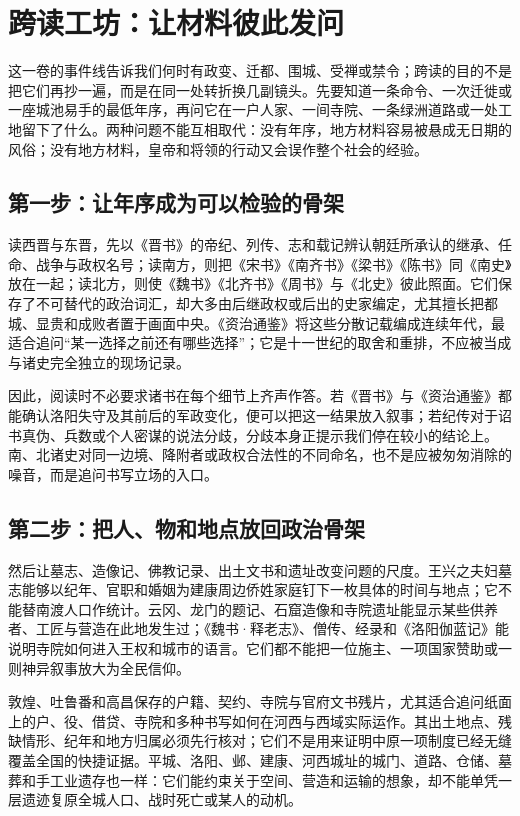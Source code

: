 \section{跨读工坊：让材料彼此发问}
\label{sec:synthesis-cross-reading}

这一卷的事件线告诉我们何时有政变、迁都、围城、受禅或禁令；跨读的目的不是把它们再抄一遍，而是在同一处转折换几副镜头。先要知道一条命令、一次迁徙或一座城池易手的最低年序，再问它在一户人家、一间寺院、一条绿洲道路或一处工地留下了什么。两种问题不能互相取代：没有年序，地方材料容易被悬成无日期的风俗；没有地方材料，皇帝和将领的行动又会误作整个社会的经验。

\subsection{第一步：让年序成为可以检验的骨架}

读西晋与东晋，先以《晋书》的帝纪、列传、志和载记辨认朝廷所承认的继承、任命、战争与政权名号；读南方，则把《宋书》《南齐书》《梁书》《陈书》同《南史》放在一起；读北方，则使《魏书》《北齐书》《周书》与《北史》彼此照面。它们保存了不可替代的政治词汇，却大多由后继政权或后出的史家编定，尤其擅长把都城、显贵和成败者置于画面中央。《资治通鉴》将这些分散记载编成连续年代，最适合追问“某一选择之前还有哪些选择”；它是十一世纪的取舍和重排，不应被当成与诸史完全独立的现场记录。

因此，阅读时不必要求诸书在每个细节上齐声作答。若《晋书》与《资治通鉴》都能确认洛阳失守及其前后的军政变化，便可以把这一结果放入叙事；若纪传对于诏书真伪、兵数或个人密谋的说法分歧，分歧本身正提示我们停在较小的结论上。南、北诸史对同一边境、降附者或政权合法性的不同命名，也不是应被匆匆消除的噪音，而是追问书写立场的入口。

\subsection{第二步：把人、物和地点放回政治骨架}

然后让墓志、造像记、佛教记录、出土文书和遗址改变问题的尺度。王兴之夫妇墓志能够以纪年、官职和婚姻为建康周边侨姓家庭钉下一枚具体的时间与地点；它不能替南渡人口作统计。云冈、龙门的题记、石窟造像和寺院遗址能显示某些供养者、工匠与营造在此地发生过；《魏书·释老志》、僧传、经录和《洛阳伽蓝记》能说明寺院如何进入王权和城市的语言。它们都不能把一位施主、一项国家赞助或一则神异叙事放大为全民信仰。

敦煌、吐鲁番和高昌保存的户籍、契约、寺院与官府文书残片，尤其适合追问纸面上的户、役、借贷、寺院和多种书写如何在河西与西域实际运作。其出土地点、残缺情形、纪年和地方归属必须先行核对；它们不是用来证明中原一项制度已经无缝覆盖全国的快捷证据。平城、洛阳、邺、建康、河西城址的城门、道路、仓储、墓葬和手工业遗存也一样：它们能约束关于空间、营造和运输的想象，却不能单凭一层遗迹复原全城人口、战时死亡或某人的动机。


